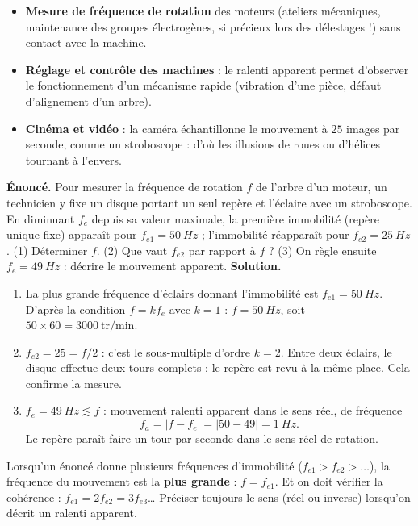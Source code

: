 \documentclass[11pt]{article}
\begin{document}
\begin{itemize}
\item \textbf{Mesure de fréquence de rotation} des moteurs (ateliers mécaniques, maintenance des groupes électrogènes, si précieux lors des délestages !) sans contact avec la machine.
\item \textbf{Réglage et contrôle des machines} : le ralenti apparent permet d'observer le fonctionnement d'un mécanisme rapide (vibration d'une pièce, défaut d'alignement d'un arbre).
\item \textbf{Cinéma et vidéo} : la caméra échantillonne le mouvement à $25$ images par seconde, comme un stroboscope : d'où les illusions de roues ou d'hélices tournant à l'envers.
\end{itemize}

\begin{exoresolu}
\textbf{Énoncé.} Pour mesurer la fréquence de rotation $f$ de l'arbre d'un moteur, un technicien y fixe un disque portant un seul repère et l'éclaire avec un stroboscope. En diminuant $f_e$ depuis sa valeur maximale, la première immobilité (repère unique fixe) apparaît pour $f_{e1} = \SI{50}{Hz}$ ; l'immobilité réapparaît pour $f_{e2} = \SI{25}{Hz}$. (1) Déterminer $f$. (2) Que vaut $f_{e2}$ par rapport à $f$ ? (3) On règle ensuite $f_e = \SI{49}{Hz}$ : décrire le mouvement apparent.
\tcblower
\textbf{Solution.}
\begin{enumerate}
\item La plus grande fréquence d'éclairs donnant l'immobilité est $f_{e1} = \SI{50}{Hz}$. D'après la condition $f = k f_e$ avec $k = 1$ : $\boxed{f = \SI{50}{Hz}}$, soit $50 \times 60 = 3000~\text{tr/min}$.
\item $f_{e2} = 25 = f/2$ : c'est le sous-multiple d'ordre $k = 2$. Entre deux éclairs, le disque effectue deux tours complets ; le repère est revu à la même place. Cela confirme la mesure.
\item $f_e = \SI{49}{Hz} \lesssim f$ : mouvement ralenti apparent dans le sens réel, de fréquence
\[ f_a = |f - f_e| = |50 - 49| = \SI{1}{Hz}. \]
Le repère paraît faire un tour par seconde dans le sens réel de rotation.
\end{enumerate}
\end{exoresolu}

\begin{attention}
Lorsqu'un énoncé donne plusieurs fréquences d'immobilité ($f_{e1} > f_{e2} > \dots$), la fréquence du mouvement est la \textbf{plus grande} : $f = f_{e1}$. Et on doit vérifier la cohérence : $f_{e1} = 2 f_{e2} = 3 f_{e3}$\dots{} Préciser toujours le sens (réel ou inverse) lorsqu'on décrit un ralenti apparent.
\end{attention}
\end{document}
